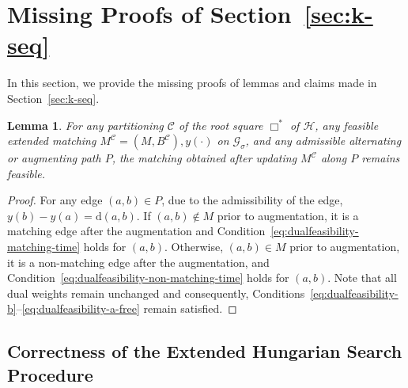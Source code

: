 \documentclass[11pt,onecolumn]{article}
\def\mcC{{\mathcal{C}}}
\def\mcG{{\mathcal{G}}}
\def\mcH{{\mathcal{H}}}
\newcommand{\cell}{\Box}
\newcommand{\distance}[2]{\mathrm{d}(#1, #2)}
\newtheorem{lemma}{Lemma}[section]
\begin{document}
%
%
%
%
%
%

%
%

%
%
%
%
%

%
%
%
%
%
%
%
%
%
%
%
%
%
%











%
%
%
%
%
%
%
%
%
%
%
%
%
%
%
%



%


%
%
%
%
%
%
%
%
%
%
%
%
%
%
%
%
%





\section{Missing Proofs of Section~\ref{sec:k-seq}}\label{sec:k-seq-appendix}

In this section, we provide the missing proofs of lemmas and claims made in Section~\ref{sec:k-seq}.

\begin{lemma}\label{lemma:augment}
    For any partitioning $\mcC$ of the root square $\cell^*$ of $\mcH$, any feasible extended matching $M^\mcC=(M, B^\mcC), y(\cdot)$ on $\mcG_\sigma$, and any admissible alternating or augmenting path $P$, the matching obtained after updating $M^\mcC$ along $P$ remains feasible.
\end{lemma}
\begin{proof}
    For any edge $(a,b)\in P$, due to the admissibility of the edge, $y(b)-y(a)=\distance{a}{b}$. If $(a,b)\notin M$ prior to augmentation, it is a matching edge after the augmentation and Condition~\eqref{eq:dualfeasibility-matching-time} holds for $(a,b)$. Otherwise, $(a,b)\in M$ prior to augmentation, it is a non-matching edge after the augmentation, and Condition~\eqref{eq:dualfeasibility-non-matching-time} holds for $(a,b)$. Note that all dual weights remain unchanged and consequently, Conditions~\eqref{eq:dualfeasibility-b}--\eqref{eq:dualfeasibility-a-free} remain satisfied.
\end{proof}


%

\subsection{Correctness of the Extended Hungarian Search Procedure}
\end{document}
